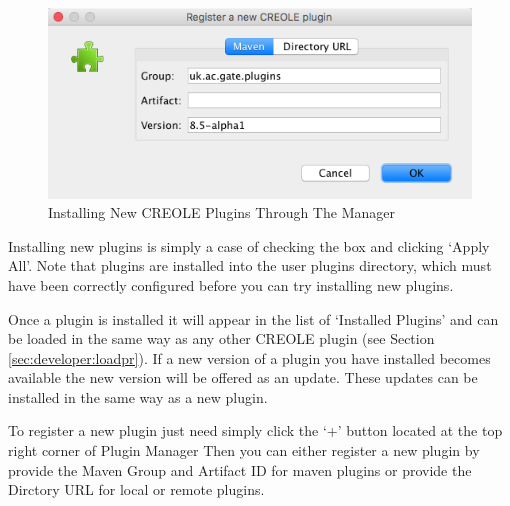 \begin{figure}[htb]
\begin{center}
\includegraphics[width=14cm]{registernewplugin.png}
\end{center}
\caption{Installing New CREOLE Plugins Through The Manager}
\label{fig:plugin-manager-config}
\end{figure}


Installing new plugins is simply a case of checking the box and clicking `Apply All'.
Note that plugins are installed into the user plugins directory, which must have been
correctly configured before you can try installing new plugins.

Once a plugin is installed it will appear in the list of `Installed Plugins' and can be
loaded in the same way as any other CREOLE plugin (see Section \ref{sec:developer:loadpr}).
If a new version of a plugin you have installed becomes available the new version
will be offered as an update. These updates can be installed in the same way as a new plugin.

To register a new plugin just need simply click the `+' button located at the top right corner of Plugin Manager
Then you can either register a new plugin by provide the Maven Group and Artifact ID for maven plugins or provide the Dirctory URL 
for local or remote plugins.







